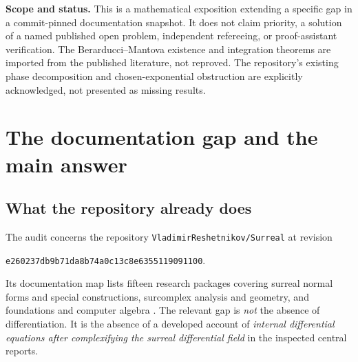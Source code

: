 \documentclass[11pt,a4paper]{article}
\numberwithin{equation}{section}
\theoremstyle{definition}
\theoremstyle{remark}
\begin{document}
\begin{titlepage}
\begin{minipage}{0.94\textwidth}
\begin{abstract}
This yields exact power and iterated-logarithm thresholds, a classification of
all homogeneous equations with ordinary complex constant coefficients, and an
existence criterion for fundamental matrices of upper-triangular systems.
For missing solutions we construct explicit Picard--Vessiot extensions and
prove that they introduce no new constants; integer relations among the
obstructions determine the differential Galois torus of a diagonal system.
We also explain why formal analytic solutions in an external variable do not
contradict these obstructions, and give a set-sized localization argument.
All principal deductions are proved. An accompanying standard-library Python
program passes 1,395 exact finite checks, which test examples and algebraic
identities rather than verify the infinitary theorems.
\end{abstract}
\end{minipage}
\vfill
\begin{minipage}{0.94\textwidth}\small
\textbf{Scope and status.} This is a mathematical exposition extending a
specific gap in a commit-pinned documentation snapshot. It does not claim
priority, a solution of a named published open problem, independent refereeing,
or proof-assistant verification. The Berarducci--Mantova existence and
integration theorems are imported from the published literature, not reproved.
The repository's existing phase decomposition and chosen-exponential
obstruction are explicitly acknowledged, not presented as missing results.
\end{minipage}
\end{titlepage}
\hypersetup{pageanchor=true}
\begingroup\small\setlength{\parskip}{0pt}\setlength{\baselineskip}{11pt}
\makeatletter
\renewcommand{\l@section}[2]{%
  \addpenalty{-\@highpenalty}\vskip0.45em
  \begingroup\bfseries\@dottedtocline{1}{0em}{2.1em}{#1}{#2}\endgroup}
\renewcommand{\l@subsection}{\@dottedtocline{2}{1.5em}{2.8em}}
\makeatother
\tableofcontents\endgroup
\clearpage{}

\section{The documentation gap and the main answer}\label{sec:gap}

\subsection{What the repository already does}
The audit concerns the repository \texttt{VladimirReshetnikov/Surreal} at
revision
\begin{center}\small\texttt{e260237db9b71da8b74a0c13c8e6355119091100}.\end{center}
Its documentation map lists fifteen research packages covering surreal
normal forms and special constructions, surcomplex analysis and geometry,
and foundations and computer algebra \cite{RepoMap}. The relevant gap is
\emph{not} the absence of differentiation. It is the absence of a developed
account of \emph{internal differential equations after complexifying the
surreal differential field} in the inspected central reports.
\end{document}
